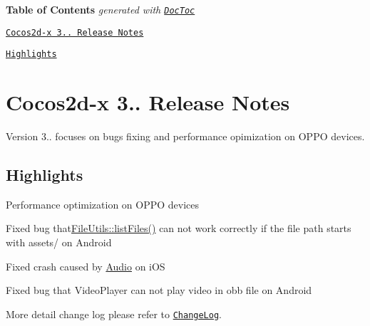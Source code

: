 {\bfseries Table of Contents} {\itshape generated with \href{https://github.com/thlorenz/doctoc}{\tt Doc\+Toc}}


\begin{DoxyItemize}
\item \href{#cocos2d-x-3172-release-notes}{\tt Cocos2d-\/x 3.. Release Notes}
\begin{DoxyItemize}
\item \href{#highlights}{\tt Highlights}
\end{DoxyItemize}
\end{DoxyItemize}

\section*{Cocos2d-\/x 3.. Release Notes}

Version 3.. focuses on bugs fixing and performance opimization on O\+P\+PO devices.

\subsection*{Highlights}


\begin{DoxyItemize}
\item Performance optimization on O\+P\+PO devices
\item Fixed bug that{\ttfamily \hyperlink{classFileUtils_a88fc43b561884e12a9a2d41a9e3b4df4}{File\+Utils\+::list\+Files()}} can not work correctly if the file path starts with {\ttfamily assets/} on Android
\item Fixed crash caused by \hyperlink{classAudio}{Audio} on i\+OS
\item Fixed bug that {\ttfamily Video\+Player} can not play video in obb file on Android
\end{DoxyItemize}

More detail change log please refer to \href{https://github.com/cocos2d/cocos2d-x/blob/v3/CHANGELOG}{\tt Change\+Log}. 